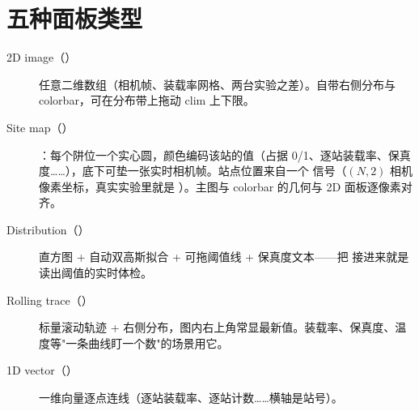 \documentclass[11pt,oneside,openany]{book}
\begin{document}
\section{五种面板类型}
\begin{description}
  \item[2D image（）] 任意二维数组（相机帧、装载率网格、两台实验之差）。自带右侧分布与 colorbar，可在分布带上拖动 clim 上下限。
  \item[Site map（）] ：每个阱位一个实心圆，颜色编码该站的值（占据 0/1、逐站装载率、保真度……），底下可垫一张实时相机帧。站点位置来自一个  信号（$(N,2)$ 相机像素坐标，真实实验里就是 ）。主图与 colorbar 的几何与 2D 面板逐像素对齐。
  \item[Distribution（）] 直方图 + 自动双高斯拟合 + 可拖阈值线 + 保真度文本——把  接进来就是读出阈值的实时体检。
  \item[Rolling trace（）] 标量滚动轨迹 + 右侧分布，图内右上角常显最新值。装载率、保真度、温度等"一条曲线盯一个数"的场景用它。
  \item[1D vector（）] 一维向量逐点连线（逐站装载率、逐站计数……横轴是站号）。
\end{description}
\end{document}
